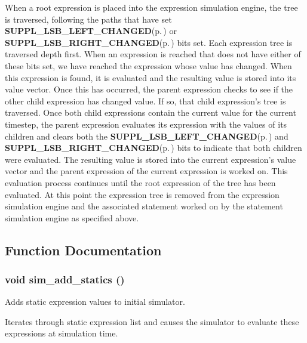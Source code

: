 \begin{Desc}
\item[]When a root expression is placed into the expression simulation engine, the tree is traversed, following the paths that have set {\bf SUPPL\_\-LSB\_\-LEFT\_\-CHANGED}{\rm (p.\,\pageref{group__expr__suppl_a9})} or {\bf SUPPL\_\-LSB\_\-RIGHT\_\-CHANGED}{\rm (p.\,\pageref{group__expr__suppl_a10})} bits set. Each expression tree is traversed depth first. When an expression is reached that does not have either of these bits set, we have reached the expression whose value has changed. When this expression is found, it is evaluated and the resulting value is stored into its value vector. Once this has occurred, the parent expression checks to see if the other child expression has changed value. If so, that child expression's tree is traversed. Once both child expressions contain the current value for the current timestep, the parent expression evaluates its expression with the values of its children and clears both the {\bf SUPPL\_\-LSB\_\-LEFT\_\-CHANGED}{\rm (p.\,\pageref{group__expr__suppl_a9})} and {\bf SUPPL\_\-LSB\_\-RIGHT\_\-CHANGED}{\rm (p.\,\pageref{group__expr__suppl_a10})} bits to indicate that both children were evaluated. The resulting value is stored into the current expression's value vector and the parent expression of the current expression is worked on. This evaluation process continues until the root expression of the tree has been evaluated. At this point the expression tree is removed from the expression simulation engine and the associated statement worked on by the statement simulation engine as specified above.\end{Desc}


\subsection{Function Documentation}
\subsubsection{\setlength{\rightskip}{0pt plus 5cm}void sim\_\-add\_\-statics ()}\label{sim_8c_a7}


Adds static expression values to initial simulator. 

Iterates through static expression list and causes the simulator to evaluate these expressions at simulation time. 
